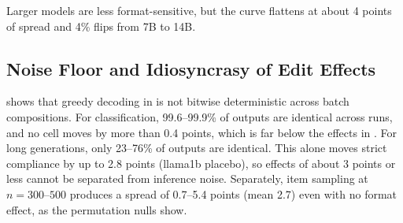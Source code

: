  Larger models are less format-sensitive, but the curve flattens at about 4 points of spread and 4\% flips from 7B to 14B.

\subsection{Noise Floor and Idiosyncrasy of Edit Effects}
\label{sec:res_noise}

\begin{table}[t]
    \centering
    \small
    \caption{Noise floor of the inference stack. Placebo edits are byte-identical to  after chat templating. Short classification outputs are almost unaffected by run-to-run nondeterminism, but long \ifeval generations often diverge, which moves compliance by up to $\sim$3 pp.}
    \label{tab:noise}
\end{table}

  shows that greedy decoding in \vllm is not bitwise deterministic across batch compositions. For classification, 99.6--99.9\% of outputs are identical across runs, and no cell moves by more than 0.4 points, which is far below the effects in . For long \ifeval generations, only 23--76\% of outputs are identical. This alone moves strict compliance by up to 2.8 points (llama1b placebo), so \ifeval effects of about 3 points or less cannot be separated from inference noise. Separately, item sampling at $n=300$--$500$ produces a spread of 0.7--5.4 points (mean 2.7) even with no format effect, as the permutation nulls show.

